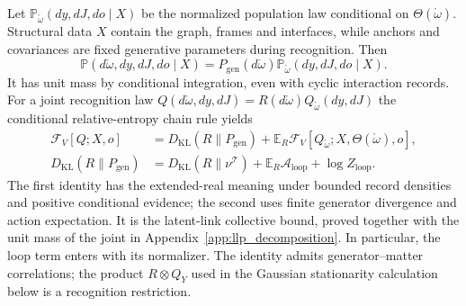 Let $\mathbb P_{\mathring\omega}(dy,dJ,do\mid X)$ be the normalized population law conditional on $\Theta(\mathring\omega)$. Structural data $X$ contain the graph, frames and interfaces, while anchors and covariances are fixed generative parameters during recognition. Then
\begin{equation}
\mathbb P(d\mathring\omega,dy,dJ,do\mid X)
=P_{\mathrm{gen}}(d\mathring\omega)\mathbb P_{\mathring\omega}(dy,dJ,do\mid X).
\label{eq:pifb_latent_population_joint}
\end{equation}
It has unit mass by conditional integration, even with cyclic interaction records. For a joint recognition law $Q(d\mathring\omega,dy,dJ)=R(d\mathring\omega)Q_{\mathring\omega}(dy,dJ)$ the conditional relative-entropy chain rule yields
\begin{equation}
\boxed{\begin{aligned}
\mathcal F_V[Q;X,o]
&=D_{\mathrm{KL}}(R\|P_{\mathrm{gen}})
+\mathbb E_R\mathcal F_V[Q_{\mathring\omega};X,\Theta(\mathring\omega),o],\\
D_{\mathrm{KL}}(R\|P_{\mathrm{gen}})
&=D_{\mathrm{KL}}(R\|\nu^{\mathcal T})+\mathbb E_R\mathcal A_{\mathrm{loop}}+\log Z_{\mathrm{loop}}.
\end{aligned}}
\label{eq:pifb_latent_collective_vfe}
\end{equation}
The first identity has the extended-real meaning under bounded record densities and positive conditional evidence; the second uses finite generator divergence and action expectation. It is the latent-link collective bound, proved together with the unit mass of the joint in Appendix~\ref{app:llp_decomposition}. In particular, the loop term enters with its normalizer. The identity admits generator--matter correlations; the product $R\otimes Q_Y$ used in the Gaussian stationarity calculation below is a recognition restriction.

